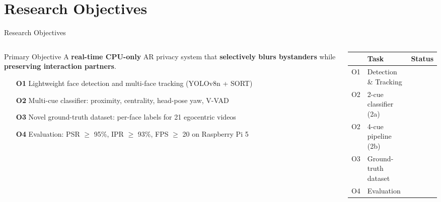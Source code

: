 \documentclass[aspectratio=169]{beamer}
\newcommand{\done}{\textcolor{green!60!black}{\ding{51}}}
\newcommand{\pending}{\textcolor{orange}{\ding{109}}}
\begin{document}
\section{Research Objectives}

\begin{frame}{Research Objectives}
\begin{columns}[T]
\begin{column}{0.52\textwidth}
  \begin{block}{Primary Objective}
    A \textbf{real-time CPU-only} AR privacy system that \textbf{selectively blurs bystanders} while \textbf{preserving interaction partners}.
  \end{block}
  \vspace{0.4cm}
  \begin{enumerate}\setlength{\itemsep}{0.3cm}
    \item[\textbf{O1}] Lightweight face detection and multi-face tracking (YOLOv8n + SORT)
    \item[\textbf{O2}] Multi-cue classifier: proximity, centrality, head-pose yaw, V-VAD
    \item[\textbf{O3}] Novel ground-truth dataset: per-face labels for 21 egocentric videos
    \item[\textbf{O4}] Evaluation: PSR $\geq$ 95\%, IPR $\geq$ 93\%, FPS $\geq$ 20 on Raspberry Pi 5
  \end{enumerate}
\end{column}
\begin{column}{0.44\textwidth}
  \vspace{0.4cm}
  \begin{table}
    \renewcommand{\arraystretch}{1.45}
    \small
    \begin{tabular}{clc}
    \toprule
    & \textbf{Task} & \textbf{Status} \\
    \midrule
    O1 & Detection \& Tracking  & \done \\
    O2 & 2-cue classifier (2a)  & \done \\
    O2 & 4-cue pipeline (2b)    & \pending \\
    O3 & Ground-truth dataset   & \pending \\
    O4 & Evaluation             & \pending \\
    \bottomrule
    \end{tabular}
  \end{table}
\end{column}
\end{columns}
\end{frame}
\end{document}
